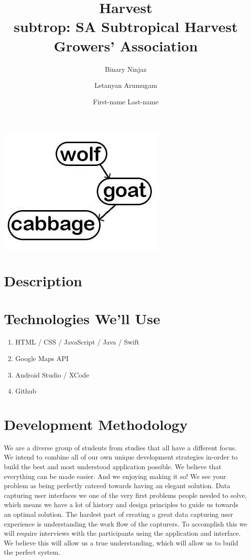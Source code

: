 \documentclass[12pt]{article}
\title{Harvest \\
\large subtrop: SA Subtropical Harvest Growers' Association
}
\author{Binary Ninjaz \and Letanyan Arumugam \and First-name Last-name}
\date{}
\begin{document}
	\maketitle
	\begin{center}
	\includegraphics{team}	
	\end{center}
	

	\newpage
	
	\section*{Description}	
	
	\section*{Technologies We'll Use}
	\begin{enumerate}
	\item HTML / CSS / JavaScript / Java / Swift
	\item Google Maps API
	\item Android Studio / XCode
	\item Github
	\end{enumerate}
	
	\section*{Development Methodology}
	We are a diverse group of students from studies that all have a different focus. We intend to combine all of our own unique development strategies in-order to build the best and most understood application possible. We believe that everything can be made easier. And we enjoying making it so! We see your problem as being perfectly catered towards having an elegant solution. Data capturing user interfaces we one of the very first problems people needed to solve, which means we have a lot of history and design principles to guide us towards an optimal solution. The hardest part of creating a great data capturing user experience is understanding the work flow of the capturers. To accomplish this we will require interviews with the participants using the application and interface. We believe this will allow us a true understanding, which will allow us to build the perfect system.
	
\end{document}
